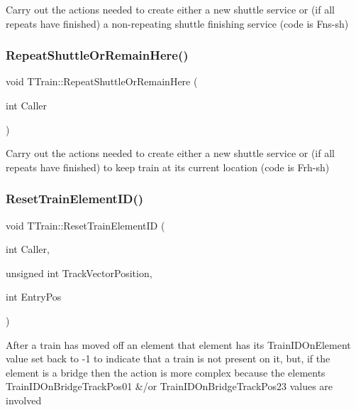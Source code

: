 Carry out the actions needed to create either a new shuttle service or (if all repeats have finished) a non-\/repeating shuttle finishing service (code is Fns-\/sh) \mbox{\label{class_t_train_ac6f5cda912103fda4da31bdca611e4b5}} 
\subsubsection{\texorpdfstring{Repeat\+Shuttle\+Or\+Remain\+Here()}{RepeatShuttleOrRemainHere()}}
{\footnotesize\ttfamily void T\+Train\+::\+Repeat\+Shuttle\+Or\+Remain\+Here (\begin{DoxyParamCaption}\item[{int}]{Caller }\end{DoxyParamCaption})\hspace{0.3cm}{\ttfamily [private]}}

Carry out the actions needed to create either a new shuttle service or (if all repeats have finished) to keep train at its current location (code is Frh-\/sh) \mbox{\label{class_t_train_ace302d98b5685104d294869b161e20a0}} 
\subsubsection{\texorpdfstring{Reset\+Train\+Element\+I\+D()}{ResetTrainElementID()}}
{\footnotesize\ttfamily void T\+Train\+::\+Reset\+Train\+Element\+ID (\begin{DoxyParamCaption}\item[{int}]{Caller,  }\item[{unsigned int}]{Track\+Vector\+Position,  }\item[{int}]{Entry\+Pos }\end{DoxyParamCaption})\hspace{0.3cm}{\ttfamily [private]}}

After a train has moved off an element that element has its Train\+I\+D\+On\+Element value set back to -\/1 to indicate that a train is not present on it, but, if the element is a bridge then the action is more complex because the element\textquotesingle{}s Train\+I\+D\+On\+Bridge\+Track\+Pos01 \&/or Train\+I\+D\+On\+Bridge\+Track\+Pos23 values are involved \mbox{\label{class_t_train_a594228489e522dfde0ffbe124cd27103}} 
